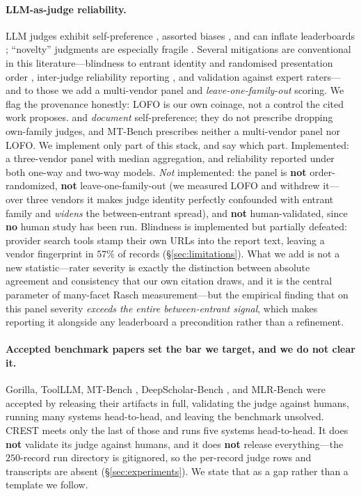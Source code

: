 \paragraph{LLM-as-judge reliability.} LLM judges exhibit self-preference
\citep{panickssery2024own}, assorted biases \citep{ye2024justice}, and can inflate leaderboards
\citep{singh2025leaderboard}; ``novelty'' judgments are especially fragile
\citep{sinhahajari2026mirage}. Several mitigations are conventional in this literature---blindness to
entrant identity and randomised presentation order \citep{zheng2023mtbench}, inter-judge reliability
reporting \citep{hayes2007alpha,koo2016icc}, and validation against expert raters---and to those we
add a multi-vendor panel and \emph{leave-one-family-out} scoring. We flag the provenance honestly:
LOFO is our own coinage, not a control the cited work proposes. \citet{panickssery2024own} and
\citet{ye2024justice} \emph{document} self-preference; they do not prescribe dropping own-family
judges, and MT-Bench prescribes neither a multi-vendor panel nor LOFO. We implement only part of this
stack, and say which part. Implemented: a three-vendor panel
with median aggregation, and reliability reported under both one-way and two-way models. \emph{Not}
implemented: the panel is \textbf{not} order-randomized, \textbf{not} leave-one-family-out (we
measured LOFO and withdrew it---over three vendors it makes judge identity perfectly confounded with
entrant family and \emph{widens} the between-entrant spread), and \textbf{not} human-validated, since
\textbf{no} human study has been run. Blindness is implemented but partially defeated: provider
search tools stamp their own URLs into the report text, leaving a vendor fingerprint in $57\%$ of
records (\S\ref{sec:limitations}). What we add is not a new statistic---rater severity is exactly the
distinction between absolute agreement and consistency that our own citation \citet{koo2016icc}
draws, and it is the central parameter of many-facet Rasch measurement---but the empirical finding
that on this panel severity \emph{exceeds the entire between-entrant signal}, which makes reporting it
alongside any leaderboard a precondition rather than a refinement.

\paragraph{Accepted benchmark papers set the bar we target, and we do not clear it.} Gorilla,
ToolLLM, MT-Bench \citep{zheng2023mtbench}, DeepScholar-Bench \citep{deepscholarbench2025}, and
MLR-Bench \citep{chen2025mlrbench} were accepted by releasing their artifacts in full, validating the judge
against humans, running many systems head-to-head, and leaving the benchmark unsolved. CREST meets
only the last of those and runs five systems head-to-head. It does \textbf{not} validate its judge
against humans, and it does \textbf{not} release everything---the $250$-record run directory is
gitignored, so the per-record judge rows and transcripts are absent (\S\ref{sec:experiments}). We
state that as a gap rather than a template we follow.

